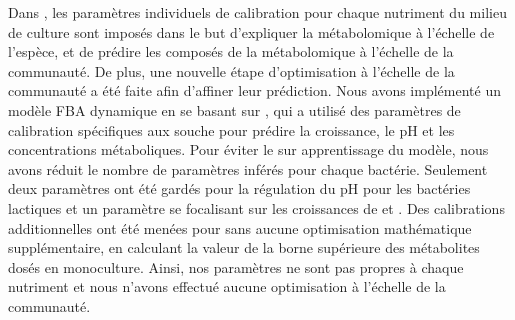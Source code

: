 Dans \citep{Ozcan.2020}, les paramètres individuels de calibration pour chaque nutriment du milieu de culture sont imposés dans le but d'expliquer la métabolomique à l'échelle de l'espèce, et de prédire les composés de la métabolomique à l'échelle de la communauté. De plus, une nouvelle étape d'optimisation à l'échelle de la communauté a été faite afin d'affiner leur prédiction. Nous avons implémenté un modèle FBA dynamique en se basant sur \citep{Mahadevan.2002}, qui a utilisé des paramètres de calibration spécifiques aux souche pour prédire la croissance, le pH et les concentrations métaboliques. Pour éviter le sur apprentissage du modèle, nous avons réduit le nombre de paramètres inférés pour chaque bactérie. Seulement deux paramètres ont été gardés pour la régulation du pH pour les bactéries lactiques et un paramètre se focalisant sur les croissances de \plantarum et \freud. Des calibrations additionnelles ont été menées pour \freud sans aucune optimisation mathématique supplémentaire, en calculant la valeur de la borne supérieure des métabolites dosés en monoculture. Ainsi, nos paramètres ne sont pas propres à chaque nutriment et nous n'avons effectué aucune optimisation à l'échelle de la communauté.\\

